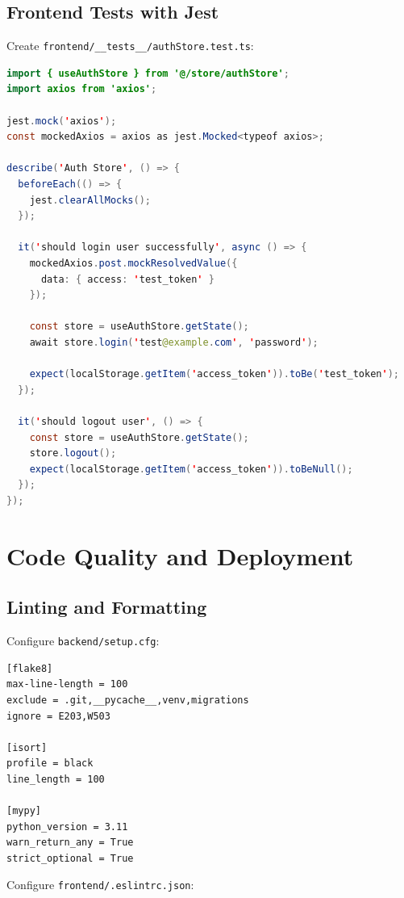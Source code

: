 \documentclass{report}
\begin{document}
\section{Frontend Tests with Jest}

Create \texttt{frontend/\_\_tests\_\_/authStore.test.ts}:

\begin{lstlisting}[language=Java, caption=Frontend store tests]
import { useAuthStore } from '@/store/authStore';
import axios from 'axios';

jest.mock('axios');
const mockedAxios = axios as jest.Mocked<typeof axios>;

describe('Auth Store', () => {
  beforeEach(() => {
    jest.clearAllMocks();
  });

  it('should login user successfully', async () => {
    mockedAxios.post.mockResolvedValue({
      data: { access: 'test_token' }
    });

    const store = useAuthStore.getState();
    await store.login('test@example.com', 'password');

    expect(localStorage.getItem('access_token')).toBe('test_token');
  });

  it('should logout user', () => {
    const store = useAuthStore.getState();
    store.logout();
    expect(localStorage.getItem('access_token')).toBeNull();
  });
});
\end{lstlisting}

\chapter{Code Quality and Deployment}

\section{Linting and Formatting}

Configure \texttt{backend/setup.cfg}:

\begin{lstlisting}[language=bash, caption=Python linting configuration]
[flake8]
max-line-length = 100
exclude = .git,__pycache__,venv,migrations
ignore = E203,W503

[isort]
profile = black
line_length = 100

[mypy]
python_version = 3.11
warn_return_any = True
strict_optional = True
\end{lstlisting}

Configure \texttt{frontend/.eslintrc.json}:
\end{document}

